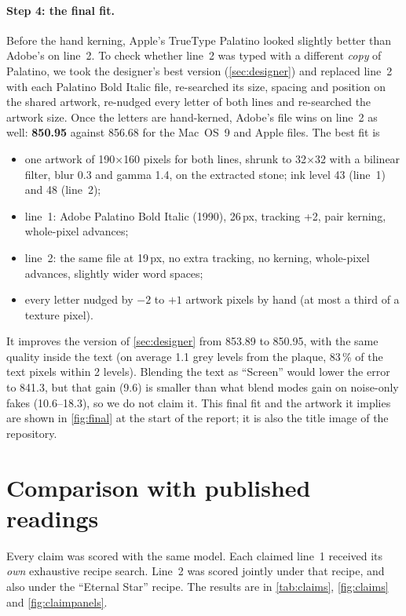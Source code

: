 \documentclass[10pt,a4paper]{article}
\newcommand{\q}[1]{``#1''}
\begin{document}
\paragraph{Step 4: the final fit.}
Before the hand kerning, Apple's TrueType Palatino looked slightly better than Adobe's on line~2. To check whether line~2
was typed with a different \emph{copy} of Palatino, we took the designer's best version (\cref{sec:designer}) and
replaced line~2 with each Palatino Bold Italic file, re-searched its size, spacing and position on the shared
artwork, re-nudged every letter of both lines and re-searched the artwork size. Once the letters are hand-kerned,
Adobe's file wins on line~2 as well: \textbf{850.95} against 856.68 for the Mac~OS~9 and Apple files. The best fit is
\begin{itemize}
\item one artwork of 190$\times$160 pixels for both lines, shrunk to 32$\times$32 with a bilinear filter, blur 0.3 and
gamma 1.4, on the extracted stone; ink level 43 (line~1) and 48 (line~2);
\item line~1: Adobe Palatino Bold Italic (1990), 26\,px, tracking +2, pair kerning, whole-pixel advances;
\item line~2: the same file at 19\,px, no extra tracking, no kerning, whole-pixel advances, slightly wider word spaces;
\item every letter nudged by $-2$ to $+1$ artwork pixels by hand (at most a third of a texture pixel).
\end{itemize}
It improves the version of \cref{sec:designer} from 853.89 to 850.95, with the same quality inside the text (on average
1.1 grey levels from the plaque, 83\,\% of the text pixels within 2 levels). Blending the text as \q{Screen} would lower
the error to 841.3, but that gain (9.6) is smaller than what blend modes gain on noise-only fakes (10.6--18.3), so we
do not claim it. This final fit and the artwork it implies are shown in \cref{fig:final} at the start of the
report; it is also the title image of the repository.

\section{Comparison with published readings}
\label{sec:claims}
Every claim was scored with the same model. Each claimed line~1 received its \emph{own} exhaustive recipe search. Line~2
was scored jointly under that recipe, and also under the \q{Eternal Star} recipe. The results are in \cref{tab:claims},
\cref{fig:claims} and \cref{fig:claimpanels}.
\end{document}
